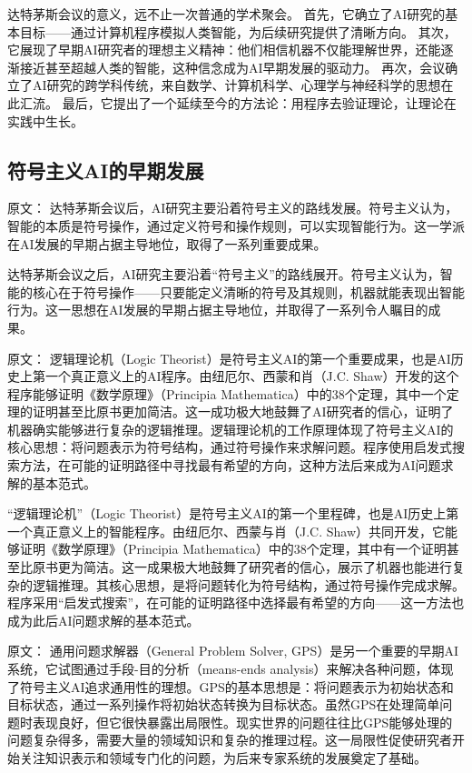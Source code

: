 达特茅斯会议的意义，远不止一次普通的学术聚会。  
首先，它确立了AI研究的基本目标——通过计算机程序模拟人类智能，为后续研究提供了清晰方向。  
其次，它展现了早期AI研究者的理想主义精神：他们相信机器不仅能理解世界，还能逐渐接近甚至超越人类的智能，这种信念成为AI早期发展的驱动力。  
再次，会议确立了AI研究的跨学科传统，来自数学、计算机科学、心理学与神经科学的思想在此汇流。  
最后，它提出了一个延续至今的方法论：用程序去验证理论，让理论在实践中生长。

\subsection{符号主义AI的早期发展}

原文：
达特茅斯会议后，AI研究主要沿着符号主义的路线发展。符号主义认为，智能的本质是符号操作，通过定义符号和操作规则，可以实现智能行为。这一学派在AI发展的早期占据主导地位，取得了一系列重要成果。

达特茅斯会议之后，AI研究主要沿着“符号主义”的路线展开。符号主义认为，智能的核心在于符号操作——只要能定义清晰的符号及其规则，机器就能表现出智能行为。这一思想在AI发展的早期占据主导地位，并取得了一系列令人瞩目的成果。

原文：
逻辑理论机（Logic Theorist）是符号主义AI的第一个重要成果，也是AI历史上第一个真正意义上的AI程序。由纽厄尔、西蒙和肖（J.C. Shaw）开发的这个程序能够证明《数学原理》（Principia Mathematica）中的38个定理，其中一个定理的证明甚至比原书更加简洁。这一成功极大地鼓舞了AI研究者的信心，证明了机器确实能够进行复杂的逻辑推理。逻辑理论机的工作原理体现了符号主义AI的核心思想：将问题表示为符号结构，通过符号操作来求解问题。程序使用启发式搜索方法，在可能的证明路径中寻找最有希望的方向，这种方法后来成为AI问题求解的基本范式。

“逻辑理论机”（Logic Theorist）是符号主义AI的第一个里程碑，也是AI历史上第一个真正意义上的智能程序。由纽厄尔、西蒙与肖（J.C. Shaw）共同开发，它能够证明《数学原理》（Principia Mathematica）中的38个定理，其中有一个证明甚至比原书更为简洁。这一成果极大地鼓舞了研究者的信心，展示了机器也能进行复杂的逻辑推理。其核心思想，是将问题转化为符号结构，通过符号操作完成求解。程序采用“启发式搜索”，在可能的证明路径中选择最有希望的方向——这一方法也成为此后AI问题求解的基本范式。

原文：
通用问题求解器（General Problem Solver, GPS）是另一个重要的早期AI系统，它试图通过手段-目的分析（means-ends analysis）来解决各种问题，体现了符号主义AI追求通用性的理想。GPS的基本思想是：将问题表示为初始状态和目标状态，通过一系列操作将初始状态转换为目标状态。虽然GPS在处理简单问题时表现良好，但它很快暴露出局限性。现实世界的问题往往比GPS能够处理的问题复杂得多，需要大量的领域知识和复杂的推理过程。这一局限性促使研究者开始关注知识表示和领域专门化的问题，为后来专家系统的发展奠定了基础。

